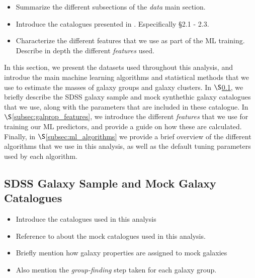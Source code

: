 \documentclass[useAMS,usenatbib, usedcolumn]{mnras}
\newcommand{\refsec}[1]{$\S$\ref{#1}}
\begin{document}
\begin{itemize}[leftmargin=0.5\parindent, labelsep=0.5\parindent]
    \item
    Summarize the different subsections of the \textit{data} main section.

    \item
    Introduce the catalogues presented in \citet{Calderon2018}.
    Especifically \S 2.1 - 2.3.

    \item
    Characterize the different features that we use as part of the ML
    training. Describe in depth the different \textit{features} used.

\end{itemize}

In this section, we present the datasets used throughout this analysis,
and introdue the main machine learning algorithms and statistical
methods that we use to estimate the masses of galaxy groups and galaxy
clusters. In \refsec{subsec:SDSS_galaxy_catalogues}, we briefly describe
the SDSS galaxy sample and mock synthethic galaxy catalogues that we use,
along with the parameters that are included in these catalogue. In
\refsec{subsec:galprop_features}, we introduce the different \textit{features}
that we use for training our ML predictors, and provide a guide on
how these are calculated. Finally, in \refsec{subsec:ml_algorithms} we
provide a brief overview of the different algorithms that we use in
this analysis, as well as the default tuning parameters used by each
algorithm.


\subsection{SDSS Galaxy Sample and Mock Galaxy Catalogues}
\label{subsec:SDSS_galaxy_catalogues}

\begin{itemize}[leftmargin=0.5\parindent, labelsep=0.5\parindent]
    \item
    Introduce the catalogues used in this analysis
    
    \item
    Reference to \citet{Calderon2018} about the mock catalogues 
    used in this analysis.
    
    \item
    Briefly mention how galaxy properties are assigned to mock
    galaxies
    
    \item
    Also mention the \textit{group-finding} step taken for each
    galaxy group.
\end{itemize}
\end{document}
